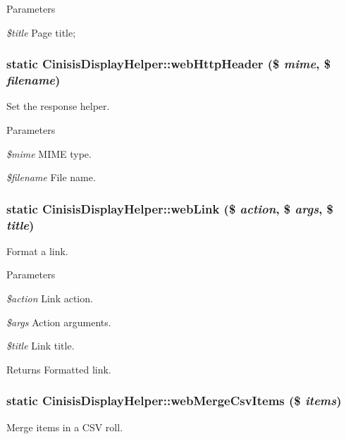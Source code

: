 \begin{DoxyParams}{Parameters}
\item[{\em \$title}]Page title; \end{DoxyParams}
\hypertarget{classCinisisDisplayHelper_a6629bfa4b0ccd26d1433ca2302ce8c41}{
\subsubsection[{webHttpHeader}]{\setlength{\rightskip}{0pt plus 5cm}static CinisisDisplayHelper::webHttpHeader (\$ {\em mime}, \/  \$ {\em filename})}}
\label{classCinisisDisplayHelper_a6629bfa4b0ccd26d1433ca2302ce8c41}
Set the response helper.


\begin{DoxyParams}{Parameters}
\item[{\em \$mime}]MIME type.\item[{\em \$filename}]File name. \end{DoxyParams}
\hypertarget{classCinisisDisplayHelper_aadc869909d8be43402d73fa3415827b4}{
\subsubsection[{webLink}]{\setlength{\rightskip}{0pt plus 5cm}static CinisisDisplayHelper::webLink (\$ {\em action}, \/  \$ {\em args}, \/  \$ {\em title})}}
\label{classCinisisDisplayHelper_aadc869909d8be43402d73fa3415827b4}
Format a link.


\begin{DoxyParams}{Parameters}
\item[{\em \$action}]Link action.\item[{\em \$args}]Action arguments.\item[{\em \$title}]Link title.\end{DoxyParams}
\begin{DoxyReturn}{Returns}
Formatted link. 
\end{DoxyReturn}
\hypertarget{classCinisisDisplayHelper_a6e04da665f31a88eb3c42579d266bd4f}{
\subsubsection[{webMergeCsvItems}]{\setlength{\rightskip}{0pt plus 5cm}static CinisisDisplayHelper::webMergeCsvItems (\$ {\em items})}}
\label{classCinisisDisplayHelper_a6e04da665f31a88eb3c42579d266bd4f}
Merge items in a CSV roll.


